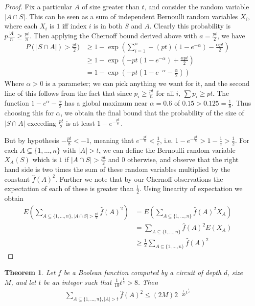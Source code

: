 \documentclass{article}
\theoremstyle{definition}
\theoremstyle{plain}
\theoremstyle{theorem}
\newtheorem{theorem}{Theorem}[section]
\begin{document}
\begin{proof}
	Fix a particular $A$ of size greater than $t$, and consider the random variable $|A \cap S|$. This can be seen as a sum of independent Bernoulli random variables $X_i$, where each $X_i$ is $1$ iff index $i$ is in both $S$ and $A$. Clearly this probability is $p\frac{|A|}{n} \geq \frac{pt}{n}$. Then applying the Chernoff bound derived above with $a = \frac{pt}{2}$, we have
\begin{align*}
	P(|S \cap A|) > \frac{pt}{2}) &\geq 1-\exp\left( \sum_{i=1}^n-(pt)(1-e^{-\alpha})-\frac{\alpha pt}{2}  \right) \\
		&\geq 1-\exp\left(-pt(1-e^{-\alpha}) + \frac{\alpha pt}{2} \right) \\
		&= 1-\exp\left( -pt(1-e^{-\alpha}-\frac{\alpha}{2}) \right)
\end{align*}
	Where $\alpha > 0$ is a parameter; we can pick anything we want for it, and the second line of this follows from the fact that since $p_i \geq \frac{pt}{n}$ for all $i$, $\sum p_i \geq pt$. The function $1-e^{\alpha} - \frac{\alpha}{2}$ has a global maximum near $\alpha = 0.6$ of $0.15 > 0.125 = \frac{1}{8}$. Thus choosing this for $\alpha$, we obtain the final bound that the probability of the size of $|S \cap A|$ exceeding $\frac{pt}{2}$ is at least $1-e^{-\frac{pt}{8}}$. \par  
	But by hypothesis $-\frac{pt}{8} < -1$, meaning that $e^{-\frac{pt}{8}} < \frac{1}{e}$, i.e. $1-e^{-\frac{pt}{8}} > 1-\frac{1}{e} > \frac{1}{2}$. For each $A \subseteq \{1,\ldots,n\}$ with $|A| > t$, we can define the Bernoulli random variable $X_A(S)$ which is $1$ if $|A \cap S| > \frac{pt}{2}$ and $0$ otherwise, and observe that the right hand side is two times the sum of these random variables multiplied by the constant $\hat{f}(A)^2$. Further we note that by our Chernoff observations the expectation of each of these is greater than $\frac{1}{2}$. Using linearity of expectation we obtain 
	\begin{align*}
		E\left( \sum_{A \subseteq \{1,\ldots,n\}, |A \cap S| > \frac{pt}{2}} \hat{f}(A)^2 \right) &= E \left( \sum_{A \subseteq \{1,\ldots,n\}} \hat{f}(A)^2 X_A \right) \\
		&= \sum_{A \subseteq \{1,\ldots,n\}} \hat{f}(A)^2 E(X_A) \\
		&\geq \frac{1}{2}\sum_{A \subseteq \{1,\ldots,n\}} \hat{f}(A)^2
	\end{align*}   
\end{proof}
\begin{theorem}
	Let $f$ be a Boolean function computed by a circuit of depth $d$, size $M$, and let $t$ be an integer such that $\frac{1}{10}t^{\frac{1}{d}} > 8$. Then 
	\begin{align}
		\sum_{A \subseteq \{1,\ldots,n\}, |A| > t} \hat{f}(A)^2 \leq (2M)2^{-\frac{1}{20}t^{\frac{1}{d}}}
	\end{align}
\end{theorem}
\end{document}
